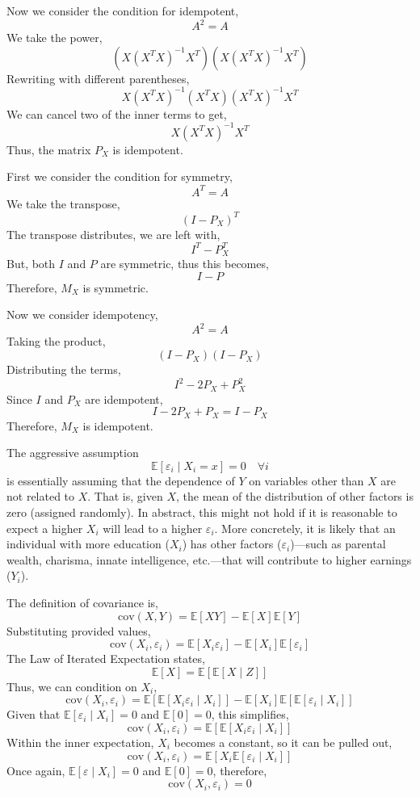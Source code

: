 \documentclass[12pt,twoside]{article}
\begin{document}
\begin{problems}
Now we consider the condition for idempotent,
$$ A^2 = A $$
We take the power,
$$ \left(X \left(X^T X\right)^{-1} X^T\right) \left(X \left(X^T X\right)^{-1} 
X^T\right) $$
Rewriting with different parentheses,
$$ X \left(X^T X\right)^{-1} \left(X^T X\right) \left(X^T X\right)^{-1} 
X^T $$
We can cancel two of the inner terms to get,
$$ \boxed{X \left(X^T X\right)^{-1} X^T} $$
Thus, the matrix $P_X$ is idempotent.

\problem  %

First we consider the condition for symmetry,
$$ A^T = A $$
We take the transpose,
$$ \left(I - P_X\right)^T $$
The transpose distributes, we are left with,
$$ I^T - P_X^T $$
But, both $I$ and $P$ are symmetric, thus this becomes,
$$ \boxed{I - P} $$
Therefore, $M_X$ is symmetric.

Now we consider idempotency,
$$ A^2 = A $$
Taking the product,
$$ (I - P_X)(I - P_X) $$
Distributing the terms,
$$ I^2 - 2P_X + P_X^2 $$
Since $I$ and $P_X$ are idempotent,
$$ I - 2P_X + P_X = \boxed{I - P_X} $$
Therefore, $M_X$ is idempotent.

\newpage

\problem  %

The aggressive assumption
$$ \mathbb{E}[\varepsilon_i \mid X_i = x] = 0\quad \forall i $$
is essentially assuming that the dependence of $Y$ on variables other than
$X$ are not related to $X$. That is, given $X$, the mean of the distribution
of other factors is zero (assigned randomly). In abstract, this might not 
hold if it is reasonable to expect a higher $X_i$ will lead to a higher 
$\varepsilon_i$. More concretely, it is likely that an individual with more
education ($X_i$) has other factors ($\varepsilon_i$)---such as parental wealth, 
charisma, innate intelligence, etc.---that will contribute to higher earnings ($Y_i$).

\problem  %

The definition of covariance is,
$$ \mathrm{cov}(X, Y) = \mathbb{E}[XY] - \mathbb{E}[X] \mathbb{E}[Y] $$
Substituting provided values,
$$ \mathrm{cov}(X_i, \varepsilon_i) = \mathbb{E}[X_i \varepsilon_i] - \mathbb{E}[X_i] 
\mathbb{E}[\varepsilon_i] $$
The Law of Iterated Expectation states,
$$ \mathbb{E}[X] = \mathbb{E}\left[\mathbb{E}[X \mid Z]\right] $$
Thus, we can condition on $X_i$,
$$ \mathrm{cov}(X_i, \varepsilon_i) = \mathbb{E}\left[\mathbb{E}[X_i \varepsilon_i 
\mid X_i]\right] - \mathbb{E}[X_i] \mathbb{E}\left[\mathbb{E}[\varepsilon_i \mid 
X_i]\right] $$
Given that $\mathbb{E}[\varepsilon_i \mid X_i] = 0$ and $\mathbb{E}[0] = 0$, this 
simplifies,
$$ \mathrm{cov}(X_i, \varepsilon_i) = \mathbb{E}\left[\mathbb{E}[X_i \varepsilon_i 
\mid X_i]\right] $$
Within the inner expectation, $X_i$ becomes a constant, so it can be pulled out,
$$ \mathrm{cov}(X_i, \varepsilon_i) = \mathbb{E}\left[X_i \mathbb{E}[\varepsilon_i 
\mid X_i]\right] $$
Once again, $\mathbb{E}[\varepsilon \mid X_i] = 0$ and $\mathbb{E}[0] = 0$, therefore,
$$ \boxed{\mathrm{cov}(X_i, \varepsilon_i) = 0} $$


\end{problems}
\end{document}

